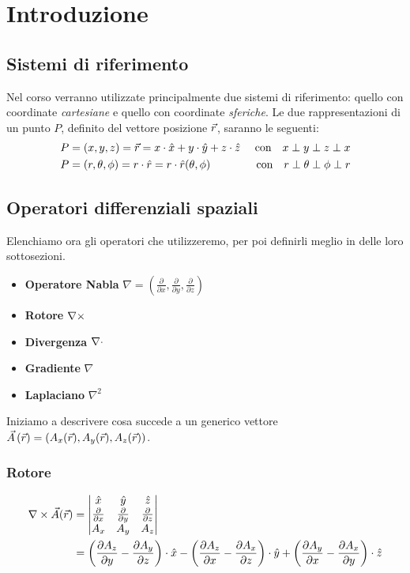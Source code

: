 \chapter{Introduzione}
\section{Sistemi di riferimento}
Nel corso verranno utilizzate principalmente due sistemi di riferimento: quello
con coordinate \emph{cartesiane} e quello con coordinate \emph{sferiche}.
Le due rappresentazioni di un punto $P$, definito del vettore posizione $\vec{r}$, saranno le seguenti:
\begin{equation} \begin{split}
  P&=(x,y,z) = \vec{r} = x \cdot \hat{x} + y \cdot \hat{y} +z \cdot \hat{z}
		& \text{ con\quad} x\perp y \perp z \perp x \\
  P&=(r,\theta,\phi) = r \cdot \hat{r} = r \cdot \hat{r}(\theta,\phi)
		& \text{ con\quad} r \perp \theta \perp \phi \perp r
  \label{eq:riferimento}
\end{split}\end{equation}

\section{Operatori differenziali spaziali}
Elenchiamo ora gli operatori che utilizzeremo, per poi definirli meglio in delle loro sottosezioni.
\begin{itemize}
  \item \textbf{Operatore Nabla} $ \nabla = \left(\frac{\partial}{\partial x},\frac{\partial}{\partial y},\frac{\partial}{\partial z}\right)$
  \item \textbf{Rotore} $\nabla\times$
  \item \textbf{Divergenza} $\nabla\cdot$
  \item \textbf{Gradiente} $\nabla$
  \item \textbf{Laplaciano} $\nabla^2$
\end{itemize}
Iniziamo a descrivere cosa succede a un generico vettore $\vec{A}\left(\vec{r}\right)=\left(A_x(\vec{r}),A_y(\vec{r}),A_z(\vec{r})\right)$.
\subsection{Rotore}
\begin{equation} \begin{split}
  \nabla\times \vec{A}(\vec{r}) &=
  \begin{vmatrix}
    \hat{x} &\hat{y} &\hat{z} \\
    \frac{\partial}{\partial x} & \frac{\partial}{\partial y} & \frac{\partial}{\partial z} \\
    A_x & A_y & A_z
  \end{vmatrix} \\
  &= \left(\frac{\partial A_z}{\partial y} - \frac{\partial A_y}{\partial z}\right)\cdot \hat{x} -
  \left(\frac{\partial A_z}{\partial x} - \frac{\partial A_x}{\partial z}\right)\cdot \hat{y} +
  \left(\frac{\partial A_y}{\partial x} - \frac{\partial A_x}{\partial y}\right)\cdot \hat{z}
\end{split}\end{equation}

